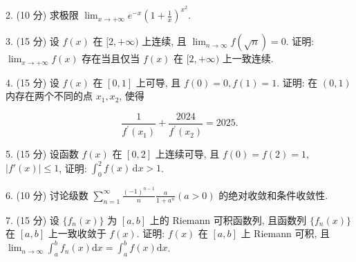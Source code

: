 \documentclass{examcollection}
\renewcommand{\displayformula}[1]{\[#1\]}
\begin{document}
{\begin{minipage}{\textwidth}
2. (10 分) 求极限 $\lim_{x \to +\infty} e^{-x} \left(1 + \frac{1}{x}\right)^{x^2}$.\par
3. (15 分) 设 $f(x)$ 在 $[2, +\infty)$ 上连续, 且 $\lim_{n \to \infty} f(\sqrt{n}) = 0$. 证明: $\lim_{x \to +\infty} f(x)$ 存在当且仅当 $f(x)$ 在 $[2, +\infty)$ 上一致连续.\par
4. (15 分) 设 $f(x)$ 在 $[0,1]$ 上可导, 且 $f(0) = 0, f(1) = 1$. 证明: 在 $(0,1)$ 内存在两个不同的点 $x_1, x_2$, 使得\par
\displayformula{\frac {1}{f ^ {\prime} (x _ {1})} + \frac {2024}{f ^ {\prime} (x _ {2})} = 2025.}\par
5. (15 分) 设函数 $f(x)$ 在 $[0,2]$ 上连续可导, 且 $f(0) = f(2) = 1$, $|f'(x)| \leq 1$, 证明: $\int_0^2 f(x) \, \mathrm{d}x > 1$.\par
6. (10 分) 讨论级数 $\sum_{n=1}^{\infty} \frac{(-1)^{n-1}}{n} \frac{a}{1 + a^n} (a > 0)$ 的绝对收敛和条件收敛性.\par
7. (15 分) 设 $\{f_n(x)\}$ 为 $[a, b]$ 上的 Riemann 可积函数列, 且函数列 $\{f_n(x)\}$ 在 $[a, b]$ 上一致收敛于 $f(x)$. 证明: $f(x)$ 在 $[a, b]$ 上 Riemann 可积, 且 $\lim_{n \to \infty} \int_{a}^{b} f_n(x) \mathrm{d}x = \int_{a}^{b} f(x) \mathrm{d}x$.\par
\end{minipage}}
\ifdim\dimexpr\ht\proofbox+\dp\proofbox\relax>\textheight
\noindent\resizebox{!}{\textheight}{\usebox{\proofbox}}\else\noindent\usebox{\proofbox}\fi\clearpage
\end{document}
